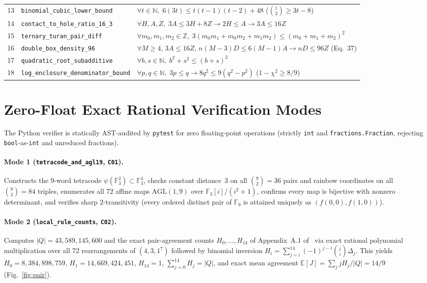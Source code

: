 \documentclass[10pt,twocolumn]{article}
\begin{document}
\begin{table}[t]
\begin{tabular}{@{}rll@{}}
13 & \texttt{binomial\_cubic\_lower\_bound} & $\forall t \in \mathbb{N},\; 6(3t) \le t(t-1)(t-2) + 48$ ($\binom{t}{3} \ge 3t - 8$) \\
14 & \texttt{contact\_to\_hole\_ratio\_16\_3} & $\forall H,A,Z,\; 3A \le 3H + 8Z \to 2H \le A \to 3A \le 16Z$ \\
15 & \texttt{ternary\_turan\_pair\_diff} & $\forall m_0,m_1,m_2 \in \mathbb{Z},\; 3(m_0 m_1 + m_0 m_2 + m_1 m_2) \le (m_0+m_1+m_2)^2$ \\
16 & \texttt{double\_box\_density\_96} & $\forall M \ge 4,\, 3A \le 16Z,\, n(M-3)D \le 6(M-1)A \to nD \le 96Z$ (Eq.~37) \\
17 & \texttt{quadratic\_root\_subadditive} & $\forall b, s \in \mathbb{N},\; b^2 + s^2 \le (b+s)^2$ \\
18 & \texttt{log\_enclosure\_denominator\_bound} & $\forall p, q \in \mathbb{N},\; 3p \le q \to 8q^2 \le 9(q^2 - p^2)$ ($1-\chi^2 \ge 8/9$) \\
\bottomrule
\end{tabular}
\end{table}

\section{Zero-Float Exact Rational Verification Modes}
\label{sec:modes}

The Python verifier  is statically AST-audited by \texttt{pytest} for zero floating-point operations (strictly \texttt{int} and \texttt{fractions.Fraction}, rejecting \texttt{bool}-as-\texttt{int} and unreduced fractions).

\paragraph{Mode 1 (\texttt{tetracode\_and\_agl19}, \texttt{C01}).}
Constructs the 9-word tetracode $\psi(\mathbb{F}_3^2) \subset \mathbb{F}_3^4$, checks constant distance~3 on all $\binom{9}{2}=36$ pairs and rainbow coordinates on all $\binom{9}{3}=84$ triples, enumerates all 72 affine maps $\mathrm{AGL}(1,9)$ over $\mathbb{F}_3[i]/(i^2+1)$, confirms every map is bijective with nonzero determinant, and verifies sharp 2-transitivity (every ordered distinct pair of $\mathbb{F}_9$ is attained uniquely as $(f(0,0), f(1,0))$).

\paragraph{Mode 2 (\texttt{local\_rule\_counts}, \texttt{C02}).}
Computes $|Q| = 43{,}589{,}145{,}600$ and the exact pair-agreement counts $H_0,\dots,H_{14}$ of Appendix~A.1 of~\cite{bhandari2026triff} via exact rational polynomial multiplication over all 72 rearrangements of $(4,3,1^7)$ followed by binomial inversion $H_i = \sum_{j=i}^{14} (-1)^{j-i} \binom{j}{i} \Delta_j$. This yields $H_0 = 8{,}384{,}898{,}759$, $H_1 = 14{,}669{,}424{,}451$, $H_{14} = 1$, $\sum_{j=0}^{14} H_j = |Q|$, and exact mean agreement $\mathbb{E}[J] = \sum_j j H_j / |Q| = 14/9$ (Fig.~\ref{fig:pair}).
\end{document}
